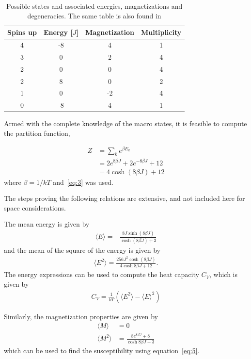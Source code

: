 \documentclass[aps,reprint]{revtex4-1}
\newcommand{\mean}[1]{\langle #1 \rangle}
\begin{document}
\begin{table}[H]
  \caption{Possible states and associated energies, magnetizations and degeneracies.
  The same table is also found in \cite{mortenjensen}}
  \label{tab:2x2values}
    \begin{tabular}{cccc}
      Spins up & Energy [$J$] & Magnetization & Multiplicity \\\hline
      4        & -8           & 4             & 1            \\
      3        & 0            & 2             & 4            \\
      2        & 0            & 0             & 4            \\
      2        & 8            & 0             & 2            \\
      1        & 0            & -2            & 4            \\
      0        & -8           & 4             & 1
    \end{tabular}
\end{table}

Armed with the complete knowledge of the macro states, it is feasible to compute
the partition function,

\begin{align*} \label{eq:partitionfunc}
  Z &= \sum_k e^{\beta E_k}\\
    &= 2 e^{8\beta J} + 2 e^{- 8\beta J} + 12\\
  &= 4 \cosh{(8\beta J)} + 12
\end{align*}
where \(\beta = 1/kT\) and~\eqref{eq:3} was used.


The steps proving the following relations are extensive, and not included here
for space considerations.

The mean energy is given by
\begin{align*}
  \mean{E} = -\frac{8 J \sinh{(8\beta J)}}{\cosh{(8\beta J)} + 3}
\end{align*}
and the mean of the square of the energy is given by
\begin{align*}
  \mean{E^2} = \frac{256 J^2 \cosh{(8\beta J)}}{4\cosh{8\beta J} + 12}.
\end{align*}
The energy expressions can be used to compute the heat capacity $C_V$, which
is given by
\begin{align*}
  C_V = \frac{1}{kT} \left( \mean{E^2} - \mean{E}^2 \right)
\end{align*}

Similarly, the magnetization properties are given by
\begin{align*}
  \mean{M} &= 0 \\
  \mean{M^2} &= \frac{8e^{8 J \beta} + 8}{\cosh{8\beta J} + 3}
\end{align*}
which can be used to find the susceptibility using equation~\eqref{eq:5}.
\end{document}
